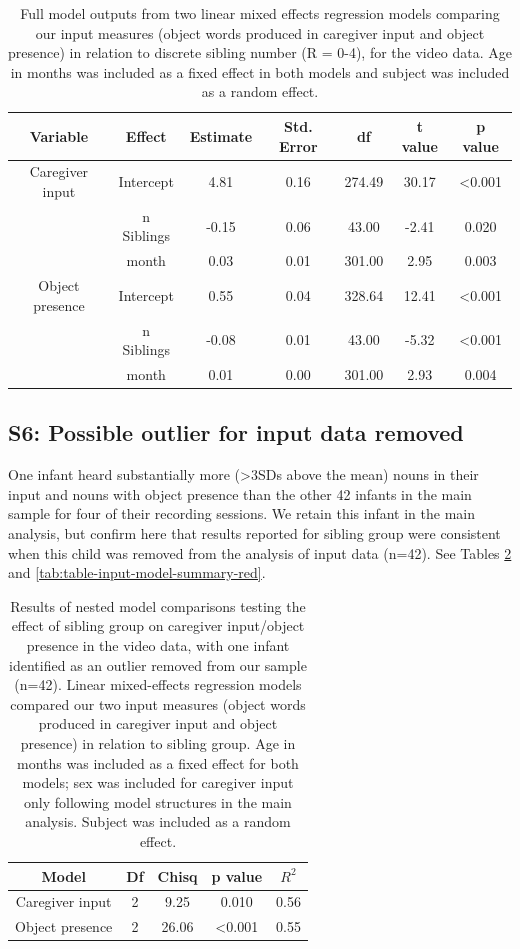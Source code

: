 \documentclass[
  man,mask,floatsintext]{apa6}
\begin{document}
\begin{longtable}[t]{ccccccc}
\caption{\label{tab:table-input-model-summary-discrete}Full model outputs from two linear mixed effects regression models comparing our input measures (object words produced in caregiver input and object presence) in relation to discrete sibling number (R = 0-4), for the video data. Age in months was included as a fixed effect in both models and subject was included as a random effect.}\\
\toprule
Variable & Effect & Estimate & Std. Error & df & t value & p value\\
\midrule
Caregiver input & Intercept & 4.81 & 0.16 & 274.49 & 30.17 & <0.001\\
 & n Siblings & -0.15 & 0.06 & 43.00 & -2.41 & 0.020\\
 & month & 0.03 & 0.01 & 301.00 & 2.95 & 0.003\\
\midrule
Object presence & Intercept & 0.55 & 0.04 & 328.64 & 12.41 & <0.001\\
 & n Siblings & -0.08 & 0.01 & 43.00 & -5.32 & <0.001\\
\addlinespace
 & month & 0.01 & 0.00 & 301.00 & 2.93 & 0.004\\
\bottomrule
\end{longtable}

\newpage

\hypertarget{s6-possible-outlier-for-input-data-removed}{%
\subsection{S6: Possible outlier for input data removed}\label{s6-possible-outlier-for-input-data-removed}}

One infant heard substantially more (\textgreater3SDs above the mean) nouns in their input and nouns with object presence than the other 42 infants in the main sample for four of their recording sessions. We retain this infant in the main analysis, but confirm here that results reported for sibling group were consistent when this child was removed from the analysis of input data (n=42). See Tables \ref{tab:table-model-comparisons-red} and \ref{tab:table-input-model-summary-red}.

\begin{longtable}[t]{ccccc}
\caption{\label{tab:table-model-comparisons-red}Results of nested model comparisons testing the effect of sibling group on caregiver input/object presence in the video data, with one infant identified as an outlier removed from our sample (n=42). Linear mixed-effects regression models compared our two input measures (object words produced in caregiver input  and object presence) in relation to sibling group. Age in months was included as a fixed effect for both models; sex was included for caregiver input only following model structures in the main analysis. Subject was included as a random effect.}\\
\toprule
Model & Df & Chisq & p value & $R^{2}$\\
\midrule
Caregiver input & 2 & 9.25 & 0.010 & 0.56\\
Object presence & 2 & 26.06 & <0.001 & 0.55\\
\bottomrule
\end{longtable}
\end{document}
